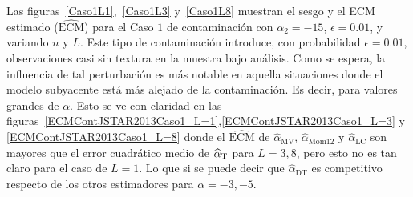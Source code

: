 
Las figuras~\ref{Caso1L1},~\ref{Caso1L3} y~\ref{Caso1L8} muestran el sesgo y el ECM estimado ($\widehat{\text{ECM}}$) para el Caso $1$ de contaminación con $\alpha_2=-15$, $\epsilon=0.01$, y variando $n$ y $L$.  
Este tipo de contaminación introduce, con probabilidad $\epsilon=0.01$, observaciones casi sin textura en la muestra bajo análisis. Como se espera, la influencia de tal perturbación es más notable en aquella situaciones donde el modelo subyacente está más alejado de la contaminación. Es decir, para valores grandes de $\alpha$. Esto se ve con claridad en las figuras~\ref{ECMContJSTAR2013Caso1_L=1},\ref{ECMContJSTAR2013Caso1_L=3} y \ref{ECMContJSTAR2013Caso1_L=8} donde el $\widehat{\text{ECM}}$ de $\widehat\alpha_{\text{MV}}$, $\widehat\alpha_{\text{Mom12}}$ y $\widehat\alpha_{\text{LC}}$ son mayores que el error cuadrático medio de $\widehat\alpha_{\text T}$ para $L=3,8$, pero esto no es tan claro para el caso de $L=1$. Lo que si se puede decir que $\widehat\alpha_{\text {DT}}$ es competitivo respecto de los otros estimadores para $\alpha=-3,-5$.

